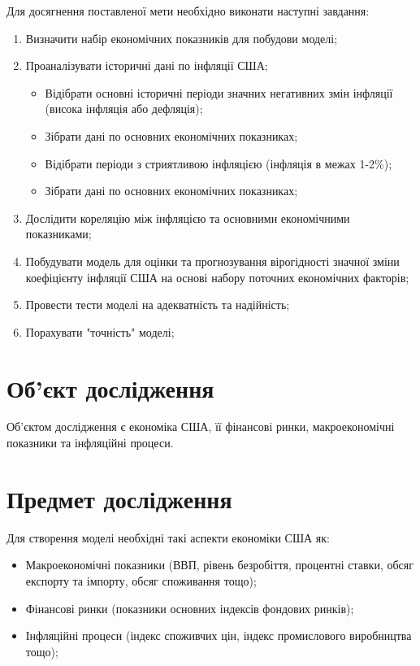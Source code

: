 \documentclass[11pt,a4paper]{article}
\begin{document}
Для досягнення поставленої мети необхідно виконати наступні завдання:
\begin{enumerate}
    \item Визначити набір економічних показників для побудови моделі;
    \item Проаналізувати історичні дані по інфляції США;
        \begin{itemize}
            \item Відібрати основні історичні періоди значних негативних змін інфляції (висока інфляція або дефляція);
            \item Зібрати дані по основних економічних показниках;
            \item Відібрати періоди з стриятливою інфляцією (інфляція в межах 1-2\%);
            \item Зібрати дані по основних економічних показниках;
        \end{itemize}
    \item Дослідити кореляцію між інфляцією та основними економічними показниками;
    \item Побудувати модель для оцінки та прогнозування вірогідності значної зміни коефіцієнту інфляції США на основі набору поточних економічних факторів;
    \item Провести тести моделі на адекватність та надійність;
    \item Порахувати "точність" моделі;
\end{enumerate}

\section*{\textbf{Об'єкт дослідження}}

Об'єктом дослідження є економіка США, її фінансові ринки, макроекономічні показники та інфляційні процеси.

\section*{\textbf{Предмет дослідження}}

Для створення моделі необхідні такі аспекти економіки США як:
\begin{itemize}
    \item Макроекономічні показники (ВВП, рівень безробіття, процентні ставки, обсяг експорту та імпорту, обсяг споживання тощо);
    \item Фінансові ринки (показники основних індексів фондових ринків);
    \item Інфляційні процеси (індекс споживчих цін, індекс промислового виробництва тощо);
\end{itemize}
\end{document}
